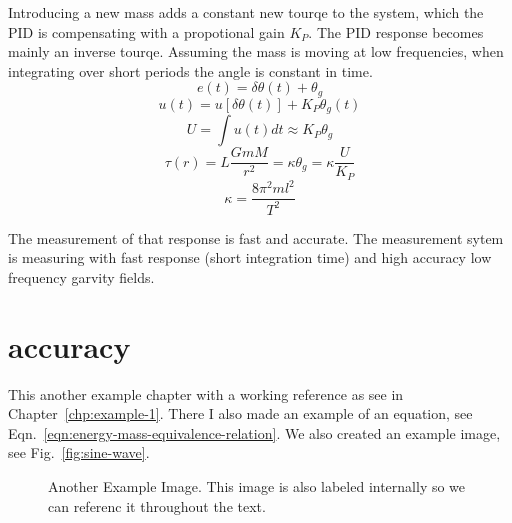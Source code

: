 \documentclass[\main/master.tex]{subfiles}
\begin{document}
Introducing a new mass adds a constant new tourqe to the system, which the PID is compensating with a propotional gain $K_P$. The PID response becomes mainly an inverse tourqe. Assuming the mass is moving at low frequencies, when integrating over short periods the angle is constant in time.
\begin{equation}
e(t) = \delta\theta(t) + \theta_g    \label{eqn:PID_measurement}
\end{equation}
\begin{equation}
u(t) = u[ \delta\theta(t)] + K_P\theta_g(t) \label{eqn:PID_measurement_eq}
\end{equation}
\begin{equation}
U = \int u(t)dt  \approx K_P\theta_g \label{eqn:PID_measurement_eq}
\end{equation}
\begin{equation}
\tau(r) = L\frac{GmM}{r^2} =  \kappa\theta_g = \kappa\frac{U}{K_P}      \label{eqn:pid_gravitation_tourqe}
\end{equation}
\begin{equation}
\kappa =\frac{8\pi^2ml^2}{T^2}    \label{eqn:empirical_tourqe}
\end{equation}

The measurement of that response is fast and accurate. The measurement sytem is measuring with fast response (short integration time) and high accuracy low frequency garvity fields. 

 
 
 
 





\section{accuracy}
\doublespacing
\hspace{5 mm} This another example chapter with a working reference as see in Chapter~\ref{chp:example-1}. There I also made an example of an equation, see Eqn.~\ref{eqn:energy-mass-equivalence-relation}. We also created an example image, see Fig.~\ref{fig:sine-wave}.
\begin{figure}[htbp]
	\centering
	\caption[Another Example Image]{Another Example Image. This image is also labeled internally so we can referenc it throughout the text.}
	\label{fig:cosine-wave}
\end{figure}
\end{document}
